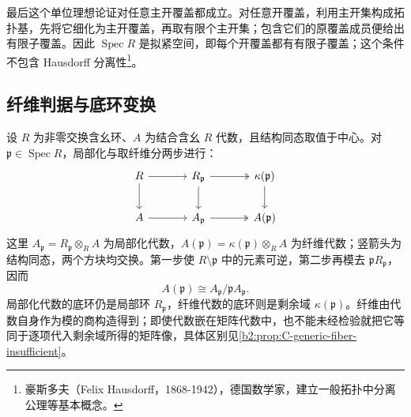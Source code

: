 最后这个单位理想论证对任意主开覆盖都成立。对任意开覆盖，利用主开集构成拓扑基，先将它细化为主开覆盖，再取有限个主开集；包含它们的原覆盖成员便给出有限子覆盖。因此 \(\operatorname{Spec}R\) 是拟紧空间，即每个开覆盖都有有限子覆盖；这个条件不包含 Hausdorff 分离性\footnote{豪斯多夫（Felix Hausdorff，1868-1942），德国数学家，建立一般拓扑中分离公理等基本概念。}。

\subsection{纤维判据与底环变换}
\label{b2:subsec:C02:02}

设 \(R\) 为非零交换含幺环、\(A\) 为结合含幺 \(R\) 代数，且结构同态取值于中心。对 \(\mathfrak p\in\operatorname{Spec}R\)，局部化与取纤维分两步进行：
\[
	\begin{tikzcd}[column sep=3.5em,row sep=2em]
		R\arrow[r]\arrow[d]&R_{\mathfrak p}\arrow[r,two heads]\arrow[d]&\kappa(\mathfrak p)\arrow[d]\\
		A\arrow[r]&A_{\mathfrak p}\arrow[r,two heads]&A(\mathfrak p)
	\end{tikzcd}
\]
这里 \(A_{\mathfrak p}=R_{\mathfrak p}\otimes_RA\) 为局部化代数，\(A(\mathfrak p)=\kappa(\mathfrak p)\otimes_RA\) 为纤维代数；竖箭头为结构同态，两个方块均交换。第一步使 \(R\setminus\mathfrak p\) 中的元素可逆，第二步再模去 \(\mathfrak pR_{\mathfrak p}\)，因而
\[
	A(\mathfrak p)\cong A_{\mathfrak p}/\mathfrak pA_{\mathfrak p}.
\]
局部化代数的底环仍是局部环 \(R_{\mathfrak p}\)，纤维代数的底环则是剩余域 \(\kappa(\mathfrak p)\)。纤维由代数自身作为模的商构造得到；即使代数嵌在矩阵代数中，也不能未经检验就把它等同于逐项代入剩余域所得的矩阵像，具体区别见\cref{b2:prop:C-generic-fiber-insufficient}。

